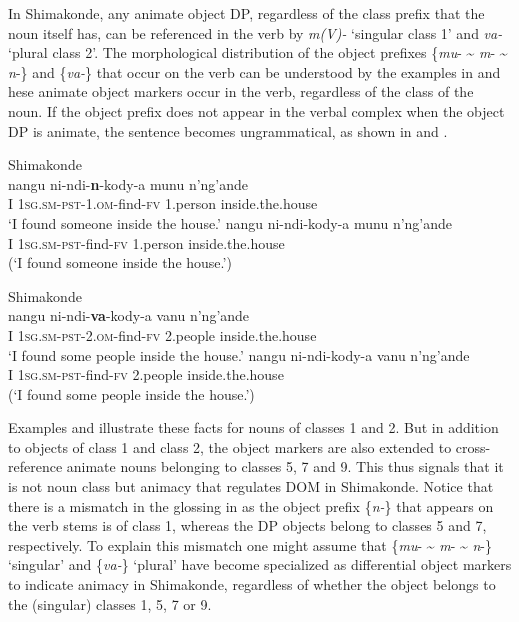 \documentclass[output=paper]{langsci/langscibook}
\begin{document}
{In Shimakonde, any animate object DP, regardless of the class prefix that the noun itself has, can be referenced in the verb by }{\textit{m(V)- }}{‘singular class 1’ and }{\textit{va-}} {‘plural class 2’. }{The morphological distribution of the object prefixes }{\{}{\textit{mu}}{- {\textasciitilde} }{\textit{m}}{- {\textasciitilde} }{\textit{n}}{-\} and \{}{\textit{va-}}{\} that occur on the verb }{can be understood by the examples in } {and} hese animate object markers occur in the verb, regardless of the class of the noun. {If the object prefix does not appear in the verbal complex when the object DP is animate, the sentence becomes ungrammatical, as shown in } {and} .


\ea\label{ex:nguna:9} {Shimakonde}\\
\ea
\gll nangu       ni-ndi-\textbf{n}-kody-a                      munu            n'ng'ande\\
     I               \textsc{1sg.sm-pst}-1.\textsc{om}-find-\textsc{fv}       1.person       inside.the.house\\
\glt ‘I found someone inside the house.’
\ex\label{ex:nguna:}
\gll *nangu     ni-ndi-kody-a                         munu            n'ng'ande\\
     I               \textsc{1sg.sm-pst}-find-\textsc{fv}                1.person       inside.the.house\\
\glt (‘I found someone inside the house.’)
\z
\z


\ea\label{ex:nguna:10} {Shimakonde}\\
\ea
\gll nangu      ni-ndi-\textbf{va}-kody-a                     vanu             n'ng'ande\\
     I              \textsc{1sg.sm-pst-2.om}-find-\textsc{fv}        2.people       inside.the.house\\
\glt ‘I found some people inside the house.’
\ex\label{ex:nguna:}
\gll *nangu     ni-ndi-kody-a                        vanu              n'ng'ande\\
     I               \textsc{1sg.sm-pst}-find-\textsc{fv}               2.people        inside.the.house\\
\glt (‘I found some people inside the house.’)
\z
\z

Examples  {and }  illustrate these facts for nouns of classes 1 and 2. But in addition to objects of class 1 and class 2, the object markers are also extended to cross-reference animate nouns belonging to classes 5, 7 and 9. This thus signals that {it is not noun class but animacy }that regulates DOM in Shimakonde. Notice that there is a mismatch in the glossing in  as the object prefix  \{{\textit{n-}}\} that appears on the verb stems is of class 1, whereas the DP objects belong to classes 5 and 7, respectively. To explain this mismatch one might assume that \{{\textit{mu}}- {\textasciitilde} {\textit{m}}- {\textasciitilde} {\textit{n}}-\} ‘singular’ and \{\textit{va-}\} ‘plural’ have become specialized as differential object markers to indicate animacy in Shimakonde, regardless of whether the object belongs to the (singular) classes 1, 5, 7 or 9.
\end{document}
